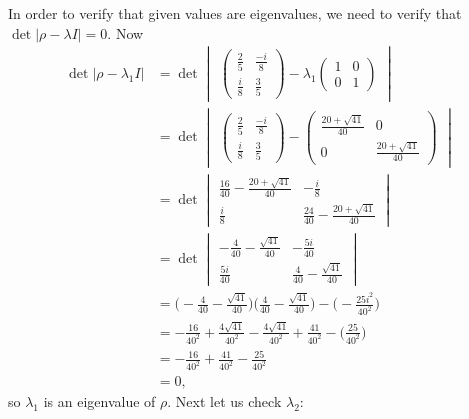 \documentclass[10pt]{article}
\begin{document}
In order to verify that given values are eigenvalues, we need to verify that $\det |\rho - \lambda I| = 0$. Now
\begin{align*}
\det |\rho - \lambda_1 I| &= \det 
\begin{vmatrix}
\begin{pmatrix}
\frac{2}{5} & \frac{-i}{8} \\
\frac{i}{8}  & \frac{3}{5}
\end{pmatrix}
- \lambda_1 
\begin{pmatrix}
1 & 0 \\
0 & 1
\end{pmatrix}
\end{vmatrix} \\
   &= \det
   \begin{vmatrix}
   \begin{pmatrix}
       \frac{2}{5} & \frac{-i}{8} \\
       \frac{i}{8}  & \frac{3}{5}
   \end{pmatrix}
   -
   \begin{pmatrix}
   \frac{20 + \sqrt{41}}{40} & 0 \\
   0 & \frac{20 + \sqrt{41}}{40} 
   \end{pmatrix}
   \end{vmatrix} \\
   &= \det
   \begin{vmatrix}
   \frac{16}{40} - \frac{20 + \sqrt{41}}{40} & -\frac{i}{8} \\
   \frac{i}{8}  &  \frac{24}{40} - \frac{20 + \sqrt{41}}{40}
   \end{vmatrix} \\
   &= \det \begin{vmatrix}
   -\frac{4}{40} - \frac{\sqrt{41}}{40} & -\frac{5i}{40} \\
   \frac{5i}{40}   & \frac{4}{40} - \frac{\sqrt{41}}{40}
   \end{vmatrix} \\
   &= \Bigg( -\frac{4}{40} - \frac{\sqrt{41}}{40} \Bigg) \Bigg( \frac{4}{40} - \frac{\sqrt{41}}{40} \Bigg) - \Bigg( -\frac{25i^2}{40^2} \Bigg) \\
   &= -\frac{16}{40^2} + \frac{4\sqrt{41}}{40^2} - \frac{4\sqrt{41}}{40^2} + \frac{41}{40^2} - \Bigg( \frac{25}{40^2}\Bigg) \\
   &= -\frac{16}{40^2} + \frac{41}{40^2} - \frac{25}{40^2} \\
   &= 0,
\end{align*}
so $\lambda_1$ is an eigenvalue of $\rho$. Next let us check $\lambda_2$:
\end{document}
